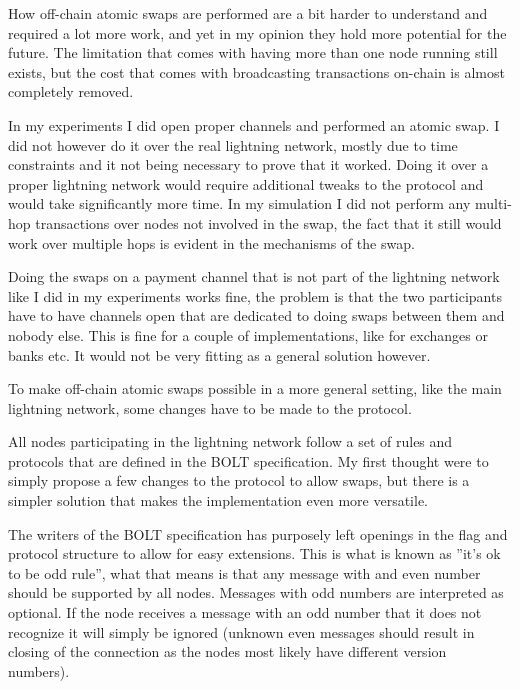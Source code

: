 How off-chain atomic swaps are performed are a bit harder to understand and 
required a lot more work, and yet in my opinion they hold more potential for 
the future. The limitation that comes with having more than one node running 
still exists, but the cost that comes with broadcasting transactions on-chain 
is almost completely removed. 

In my experiments I did open proper channels and performed an atomic swap. 
I did not however do it over the real lightning  network, mostly due to time 
constraints and it not being necessary to prove that it worked. Doing it over 
a proper lightning network would require additional tweaks to the protocol and 
would take significantly more time. In my simulation I did not perform any 
multi-hop transactions over nodes not involved in the swap, the fact that it
still would work over multiple hops is evident in the mechanisms of the swap.

Doing the swaps on a payment channel that is not part of the lightning network
like I did in my experiments works fine, the problem is that the two participants
have to have channels open that are dedicated to doing swaps between them and nobody
else. This is fine for a couple of implementations, like for exchanges or banks 
etc. It would not be very fitting as a general solution however. 

To make off-chain atomic swaps possible in a more general setting, like the main
lightning network, some changes have to be made to the protocol. 

All nodes participating in the lightning network follow a set of rules and 
protocols that are defined in the BOLT specification.\cite{bolt} My first thought were to
simply propose a few changes to the protocol to allow swaps, but there is a 
simpler solution that makes the implementation even more versatile. 

The writers of the BOLT specification has purposely left openings in the
flag and protocol structure to allow for easy extensions.\cite{bolt} This is what is known
as ''it's ok to be odd rule'', what that means is that any  message with
and even number should be supported by all nodes. Messages with odd numbers 
are interpreted as optional. If the node receives a message with an odd number 
that it does not recognize it will simply be ignored (unknown even messages 
should result in closing of the connection as the nodes most likely
have different version numbers).

